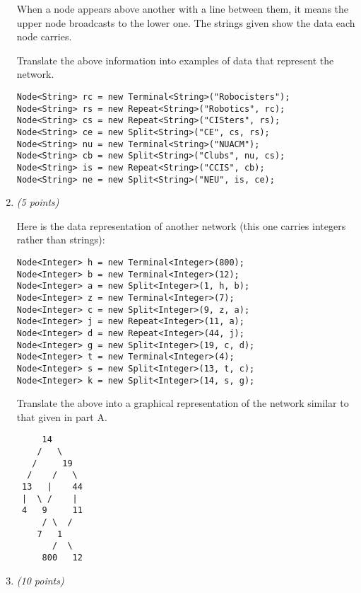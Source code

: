 \documentclass[11pt]{article}
\newcounter{Pctr}
\newenvironment{problem}{\stepcounter{Pctr}%
\begin{description}
\item[\noindent{\bf Problem} \arabic{Pctr}] 
\end{description}}{\relax}
\begin{document}
\begin{problem}
\begin{enumerate}
When a node appears above another with a line between them, it means
the upper node broadcasts to the lower one.  The strings given show
the data each node carries.

Translate the above information into examples of data that represent
the network.

\begsol{\vspace{0.5in}}
\begin{verbatim}
Node<String> rc = new Terminal<String>("Robocisters");
Node<String> rs = new Repeat<String>("Robotics", rc);
Node<String> cs = new Repeat<String>("CISters", rs);
Node<String> ce = new Split<String>("CE", cs, rs);
Node<String> nu = new Terminal<String>("NUACM");
Node<String> cb = new Split<String>("Clubs", nu, cs);
Node<String> is = new Repeat<String>("CCIS", cb);
Node<String> ne = new Split<String>("NEU", is, ce);
\end{verbatim}

\endsol

\newpage
\item  {\em{(5 points)}}

Here is the data representation of another network (this one carries
integers rather than strings):

\begin{verbatim}
Node<Integer> h = new Terminal<Integer>(800);
Node<Integer> b = new Terminal<Integer>(12);
Node<Integer> a = new Split<Integer>(1, h, b);
Node<Integer> z = new Terminal<Integer>(7);
Node<Integer> c = new Split<Integer>(9, z, a);
Node<Integer> j = new Repeat<Integer>(11, a);
Node<Integer> d = new Repeat<Integer>(44, j);
Node<Integer> g = new Split<Integer>(19, c, d);
Node<Integer> t = new Terminal<Integer>(4);
Node<Integer> s = new Split<Integer>(13, t, c);
Node<Integer> k = new Split<Integer>(14, s, g);
\end{verbatim}

Translate the above into a graphical representation of the network
similar to that given in part A.

\begsol{\vspace{0.5in}}
\begin{verbatim}
     14
    /   \
   /     19
  /    /   \
 13   |    44     
 |  \ /    |     
 4   9     11  
     / \  /
    7   1 
       /  \
     800   12
\end{verbatim}
\endsol


\newpage
\item {\em{(10 points)}}


\end{enumerate}
\end{problem}
\end{document}
